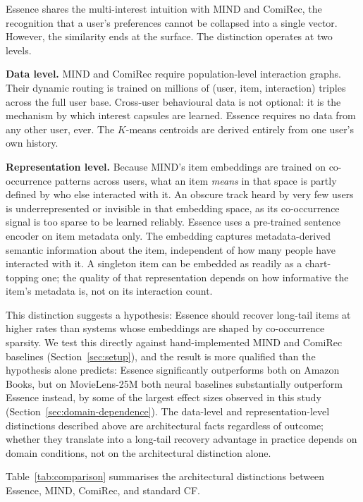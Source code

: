 \documentclass[11pt,a4paper]{article}
\begin{document}
Essence shares the multi-interest intuition with MIND and ComiRec, the
recognition that a user's preferences cannot be collapsed into a single
vector. However, the similarity ends at the surface. The distinction operates
at two levels.

\textbf{Data level.} MIND and ComiRec require population-level interaction
graphs. Their dynamic routing is trained on millions of (user, item,
interaction) triples across the full user base. Cross-user behavioural data
is not optional: it is the mechanism by which interest capsules are learned.
Essence requires no data from any other user, ever. The $K$-means centroids
are derived entirely from one user's own history.

\textbf{Representation level.} Because MIND's item embeddings are trained on
co-occurrence patterns across users, what an item \emph{means} in that space
is partly defined by who else interacted with it. An obscure track heard by very few
users is underrepresented or invisible in that embedding space, as its
co-occurrence signal is too sparse to be learned reliably. Essence uses a
pre-trained sentence encoder on item metadata only. The embedding captures metadata-derived semantic information about the item,
independent of how many people have interacted with it. A singleton item can
be embedded as readily as a chart-topping one; the quality of that
representation depends on how informative the item's metadata is, not on its
interaction count.

This distinction suggests a hypothesis: Essence should recover long-tail
items at higher rates than systems whose embeddings are shaped by
co-occurrence sparsity. We test this directly against hand-implemented
MIND and ComiRec baselines (Section~\ref{sec:setup}), and the result is
more qualified than the hypothesis alone predicts: Essence significantly
outperforms both on Amazon Books, but on MovieLens-25M both neural
baselines substantially outperform Essence instead, by some of the
largest effect sizes observed in this study
(Section~\ref{sec:domain-dependence}). The data-level and
representation-level distinctions described above are architectural facts
regardless of outcome; whether they translate into a long-tail recovery
advantage in practice depends on domain conditions, not on the
architectural distinction alone.

Table~\ref{tab:comparison} summarises the architectural distinctions between
Essence, MIND, ComiRec, and standard CF.
\end{document}
